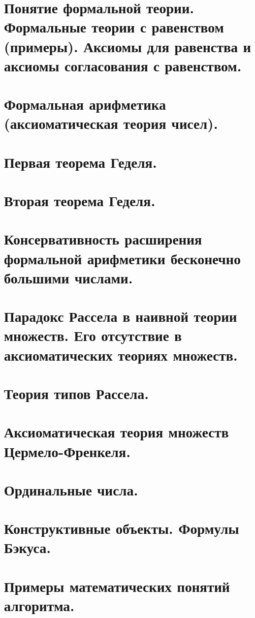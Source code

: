 \documentclass[a4paper,12pt]{article}
\theoremstyle{definition} %
\theoremstyle{definition} %
\theoremstyle{remark} %
\begin{document}
\section{Понятие формальной теории. Формальные теории с равенством (примеры). Аксиомы для	равенства и аксиомы согласования с равенством.}

\section{Формальная арифметика (аксиоматическая теория чисел).}

\section{Первая теорема Геделя.}

\section{Вторая теорема Геделя.}

\section{Консервативность расширения формальной арифметики бесконечно большими числами.}

\section{Парадокс Рассела в наивной теории множеств. Его отсутствие в аксиоматических теориях	множеств.}

\section{Теория типов Рассела.}

\section{Аксиоматическая теория множеств Цермело-Френкеля.}

\section{Ординальные числа.}

\section{Конструктивные объекты. Формулы Бэкуса.}

\section{Примеры математических понятий алгоритма.}
\end{document}
